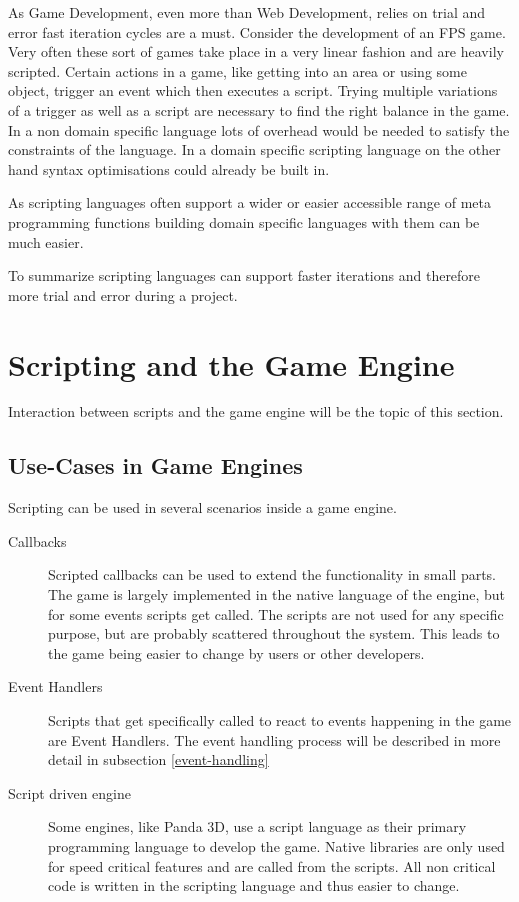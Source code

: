 \documentclass{article}
\begin{document}
As Game Development, even more than Web Development, relies on trial and error
fast iteration cycles are a must. Consider the development of an FPS game. Very
often these sort of games take place in a very linear fashion and are heavily
scripted. Certain actions in a game, like getting into an area or using some
object, trigger an event which then executes a script. Trying multiple
variations of a trigger as well as a script are necessary to find the right
balance in the game. In a non domain specific language lots of overhead would
be needed to satisfy the constraints of the language. In a domain specific
scripting language on the other hand syntax optimisations could already be
built in.

As scripting languages often support a wider or easier accessible range of
meta programming functions building domain specific languages with them can be
much easier.

To summarize scripting languages can support faster iterations and
therefore more trial and error during a project.

\section{Scripting and the Game Engine}
Interaction between scripts and the game engine will be the topic of this
section.
\subsection{Use-Cases in Game Engines}
Scripting can be used in several scenarios inside a game engine.

\begin{description}
\item[Callbacks] Scripted callbacks can be used to extend the functionality in
small parts. The game is largely implemented in the native language of the
engine, but for some events scripts get called. The scripts are not used for
any specific purpose, but are probably scattered throughout the system. This
leads to the game being easier to change by users or other developers.
\item[Event Handlers] Scripts that get specifically called to react to events
happening in the game are Event Handlers. The event handling process will be
described in more detail in subsection \ref{event-handling}
\item[Script driven engine] Some engines, like Panda 3D, use a script language
as their primary programming language to develop the game. Native libraries are
only used for speed critical features and are called from the scripts. All non
critical code is written in the scripting language and thus easier to change.

\end{description}
\end{document}
